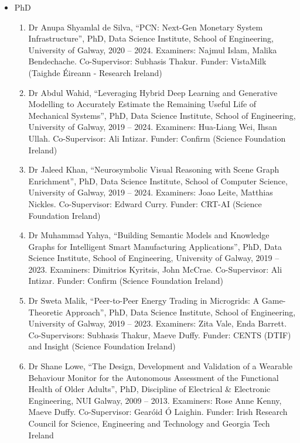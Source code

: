 \documentclass[10pt,a4paper]{res} %
\begin{document}
\begin{resume}
\begin{itemize} \itemsep -2pt
\item PhD
\begin{enumerate} \itemsep -2pt
\item Dr Anupa Shyamlal de Silva, ``PCN: Next-Gen Monetary System Infrastructure'', PhD, Data Science Institute, School of Engineering, University of Galway, 2020 -- 2024. Examiners: Najmul Islam, Malika Bendechache. Co-Supervisor: Subhasis Thakur. Funder: VistaMilk (Taighde \'{E}ireann - Research Ireland) %
\item Dr Abdul Wahid, ``Leveraging Hybrid Deep Learning and Generative Modelling to Accurately Estimate the Remaining Useful Life of Mechanical Systems'', PhD, Data Science Institute, School of Engineering, University of Galway, 2019 -- 2024. Examiners: Hua-Liang Wei, Ihsan Ullah. Co-Supervisor: Ali Intizar. Funder: Confirm (Science Foundation Ireland) %
\item Dr Jaleed Khan, ``Neurosymbolic Visual Reasoning with Scene Graph Enrichment'', PhD, Data Science Institute, School of Computer Science, University of Galway, 2019 -- 2024. Examiners: Joao Leite, Matthias Nickles. Co-Supervisor: Edward Curry. Funder: CRT-AI (Science Foundation Ireland) %
\item Dr Muhammad Yahya, ``Building Semantic Models and Knowledge Graphs for Intelligent Smart Manufacturing Applications'', PhD, Data Science Institute, School of Engineering, University of Galway, 2019 -- 2023. Examiners: Dimitrios Kyritsis, John McCrae. Co-Supervisor: Ali Intizar. Funder: Confirm (Science Foundation Ireland) %
\item Dr Sweta Malik, ``Peer-to-Peer Energy Trading in Microgrids: A Game-Theoretic Approach'', PhD, Data Science Institute, School of Engineering, University of Galway, 2019 -- 2023. Examiners: Zita Vale, Enda Barrett. Co-Supervisors: Subhasis Thakur, Maeve Duffy. Funder: CENTS (DTIF) and Insight (Science Foundation Ireland) %
\item Dr Shane Lowe, ``The Design, Development and Validation of a Wearable Behaviour Monitor for the Autonomous Assessment of the Functional Health of Older Adults'', PhD, Discipline of Electrical \& Electronic Engineering, NUI Galway, 2009 -- 2013. Examiners: Rose Anne Kenny, Maeve Duffy. Co-Supervisor: Gear\'{o}id \'{O} Laighin. Funder: Irish Research Council for Science, Engineering and Technology and Georgia Tech Ireland
\end{enumerate}

\end{itemize}
\end{resume}
\end{document}
